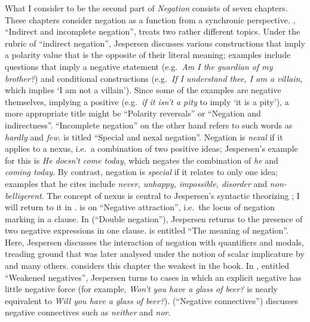 \documentclass[output=chapter]{langscibook}
\begin{document}
What I consider to be the second part of \textit{Negation} consists of seven chapters. These chapters consider negation as a function from a synchronic perspective. , ``Indirect and incomplete negation'', treats two rather different \mbox{topics}. Under the rubric of ``indirect negation'', Jespersen discusses various constructions that imply a polarity value that is the opposite of their literal meaning; examples include questions that imply a negative statement (e.g.\ \textit{Am I the guardian of my brother?}) and conditional constructions (e.g.\ \textit{If I understand thee, I am a villain}, which implies `I am not a villain'). Since some of the examples are negative themselves, implying a positive (e.g.\ \textit{if it isn’t a pity} to imply `it is a pity'), a more appropriate title might be ``Polarity reversals'' or ``Negation and indirectness''. ``Incomplete negation'' on the other hand refers to such words as \textit{hardly} and \textit{few}.  is titled %
``Special and nexal negation''. Negation is \textit{nexal} if it applies to a nexus, i.e.\ a combination of two positive ideas; Jespersen’s example for this is \textit{He doesn’t come today}, which negates the combination of \textit{he} and \textit{coming today}. By contrast, negation is \textit{special} if it relates to only one idea; examples that he cites include \textit{never, unhappy, impossible, disorder} and \textit{non-belligerent}. The concept of nexus is central to Jespersen’s syntactic theorizing \citep{Jespersen1924,Francis1989}; I will return to it in .  is on ``Negative attraction'', i.e.\ the locus of negation marking in a clause. In  (``Double negation''), Jespersen returns to the presence of two negative expressions in one clause.  is entitled ``The meaning of negation''. Here, Jespersen discusses the interaction of negation with quantifiers and modals, treading ground that was later analysed under the notion of scalar implicature by \citet{Horn1989} and many others. \citet{McCawley1995} considers this chapter the weakest in the book. In , entitled ``Weakened negatives'', Jespersen turns to cases in which an explicit negative has little negative force (for example, \textit{Won’t you have a glass of beer?} is nearly equivalent to \textit{Will you have a glass of beer?}).  (``Negative connectives'') discusses negative connectives such as \textit{neither} and \textit{nor}.\largerpage
\end{document}
